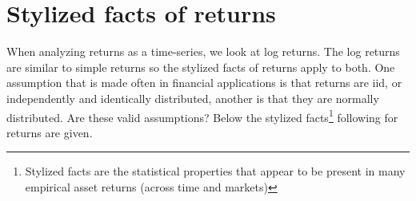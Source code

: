 \documentclass[a4paper, nobind]{templates/ociamthesis}
\begin{document}
\minitoc 

\hypertarget{styl-facts}{%
\section{Stylized facts of returns}\label{styl-facts}}

\noindent When analyzing returns as a time-series, we look at log returns. The log returns are similar to simple returns so the stylized facts of returns apply to both. One assumption that is made often in financial applications is that returns are iid, or independently and identically distributed, another is that they are normally distributed. Are these valid assumptions? Below the stylized facts\footnote{Stylized facts are the statistical properties that appear to be present in many empirical asset returns (across time and markets)} following \textcite{annaert2021} for returns are given.
\end{document}
